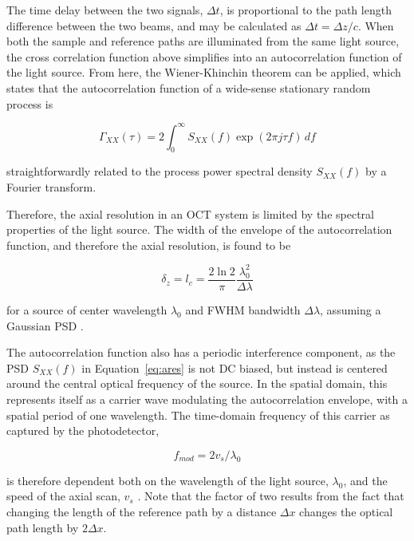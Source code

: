 The time delay between the two signals, $\Delta t$, is proportional to the path length difference between the two beams, and may be calculated as $\Delta t = \Delta z / c$. When both the sample and reference paths are illuminated from the same light source, the cross correlation function above simplifies into an autocorrelation function of the light source. From here, the Wiener-Khinchin theorem can be applied, which states that the autocorrelation function of a wide-sense stationary random process is

\begin{equation}
\Gamma_{XX}(\tau) = 2 \int_{0}^\infty S_{XX}(f) \exp(2 \pi j \tau f) \,df
\end{equation}

\noindent straightforwardly related to the process power spectral density $S_{XX}(f)$ by a Fourier transform.

Therefore, the axial resolution in an OCT system is limited by the spectral properties of the light source. The width of the envelope of the autocorrelation function, and therefore the axial resolution, is found to be

\begin{equation} \label{eq:ares}
\delta_z = l_c = \frac{2 \ln{2}}{\pi} \frac{\lambda_0^2}{\Delta \lambda}
\end{equation}

\noindent for a source of center wavelength $\lambda_0$ and FWHM bandwidth $\Delta \lambda$, assuming a Gaussian PSD \cite{fercher}.

The autocorrelation function also has a periodic interference component, as the PSD $S_{XX}(f)$ in Equation~\ref{eq:ares} is not DC biased, but instead is centered around the central optical frequency of the source. In the spatial domain, this represents itself as a carrier wave modulating the autocorrelation envelope, with a spatial period of one wavelength. The time-domain frequency of this carrier as captured by the photodetector,

\begin{equation} \label{eq:carrier}
f_{mod} = 2 v_s / \lambda_0
\end{equation}

\noindent is therefore dependent both on the wavelength of the light source, $\lambda_0$, and the speed of the axial scan, $v_s$ \cite{fercher}. Note that the factor of two results from the fact that changing the length of the reference path by a distance $\Delta x$ changes the optical path length by $ 2 \Delta x$.


